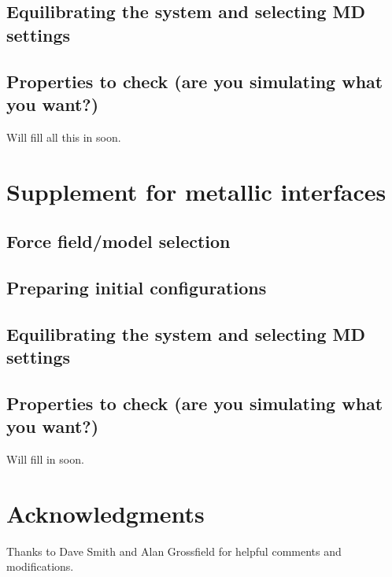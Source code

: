 \documentclass[9pt]{livecoms}
\begin{document}
\subsection{Equilibrating the system and selecting MD settings}
\label{subsec:SAMEq}
\subsection{Properties to check (are you simulating what you want?)}
\label{subsec:SAMCheck}

Will fill all this in soon.


\section{Supplement for metallic interfaces}
\label{sec:Met}

\subsection{Force field/model selection}
\label{subsec:MetFF}
\subsection{Preparing initial configurations}
\label{subsec:MetPrep}
\subsection{Equilibrating the system and selecting MD settings}
\label{subsec:MetEq}
\subsection{Properties to check (are you simulating what you want?)}
\label{subsec:MetCheck}

Will fill in soon.


\section{Acknowledgments}

Thanks to Dave Smith and Alan Grossfield for helpful comments and modifications.


\nocite{*} %
{}
\end{document}
